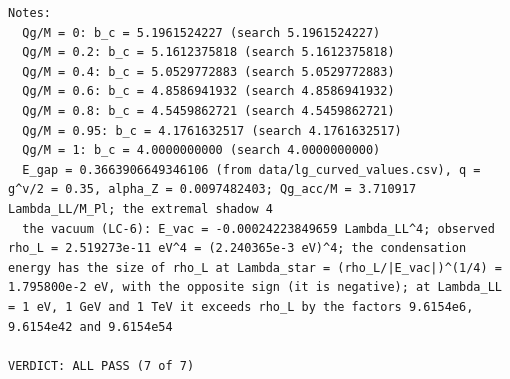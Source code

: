 \documentclass[
  10pt,
]{article}
\begin{document}
\begin{verbatim}
Notes:
  Qg/M = 0: b_c = 5.1961524227 (search 5.1961524227)
  Qg/M = 0.2: b_c = 5.1612375818 (search 5.1612375818)
  Qg/M = 0.4: b_c = 5.0529772883 (search 5.0529772883)
  Qg/M = 0.6: b_c = 4.8586941932 (search 4.8586941932)
  Qg/M = 0.8: b_c = 4.5459862721 (search 4.5459862721)
  Qg/M = 0.95: b_c = 4.1761632517 (search 4.1761632517)
  Qg/M = 1: b_c = 4.0000000000 (search 4.0000000000)
  E_gap = 0.3663906649346106 (from data/lg_curved_values.csv), q = g^v/2 = 0.35, alpha_Z = 0.0097482403; Qg_acc/M = 3.710917 Lambda_LL/M_Pl; the extremal shadow 4
  the vacuum (LC-6): E_vac = -0.00024223849659 Lambda_LL^4; observed rho_L = 2.519273e-11 eV^4 = (2.240365e-3 eV)^4; the condensation energy has the size of rho_L at Lambda_star = (rho_L/|E_vac|)^(1/4) = 1.795800e-2 eV, with the opposite sign (it is negative); at Lambda_LL = 1 eV, 1 GeV and 1 TeV it exceeds rho_L by the factors 9.6154e6, 9.6154e42 and 9.6154e54

VERDICT: ALL PASS (7 of 7)
\end{verbatim}
\end{document}
